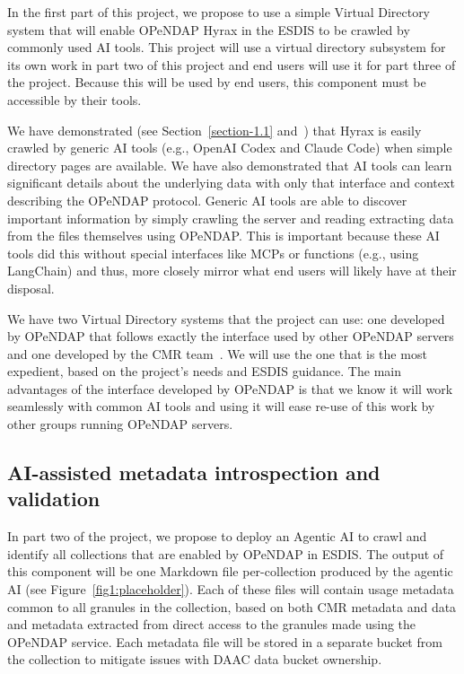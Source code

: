 \documentclass[11pt]{article}
\begin{document}
In the first part of this project, we propose to use a simple Virtual Directory system that will enable \ac{OPeNDAP} Hyrax in the \ac{ESDIS} to be crawled by commonly used \ac{AI} tools. This project will use a virtual directory subsystem for its own work in part two of this project and end users will use it for part three of the project. Because this will be used by end users, this component must be accessible by their tools. 

We have demonstrated (see Section~\ref{section-1.1} and~\cite{grepdap}) that Hyrax is easily crawled by generic \ac{AI} tools (e.g., OpenAI Codex and Claude Code) when simple directory pages are available. We have also demonstrated that \ac{AI} tools can learn significant details about the underlying data with only that interface and context describing the \ac{OPeNDAP} protocol. Generic \ac{AI} tools are able to discover important information by simply crawling the server and reading extracting data from the files themselves using \ac{OPeNDAP}. This is important because these \ac{AI} tools did this without special interfaces like \acp{MCP} or functions (e.g., using LangChain) and thus, more closely mirror what end users will likely have at their disposal.

We have two Virtual Directory systems that the project can use: one developed by \ac{OPeNDAP} that follows exactly the interface used by other \ac{OPeNDAP} servers and one developed by the \ac{CMR} team~\cite{cmrvdi}. We will use the one that is the most expedient, based on the project's needs and \ac{ESDIS} guidance. The main advantages of the interface developed by \ac{OPeNDAP} is that we know it will work seamlessly with common \ac{AI} tools and using it will ease re-use of this work by other groups running \ac{OPeNDAP} servers.


\subsection{AI-assisted metadata introspection and validation}
\label{section-2.2}
In part two of the project, we propose to deploy an Agentic \ac{AI} to crawl and identify all collections that are enabled by \ac{OPeNDAP} in \ac{ESDIS}. The output of this component will be one Markdown file per-collection produced by the agentic \ac{AI} (see Figure~\ref{fig1:placeholder}). Each of these files will contain usage metadata common to all granules in the collection, based on both \ac{CMR} metadata and data and metadata extracted from direct access to the granules made using the \ac{OPeNDAP} service. Each metadata file will be stored in a separate bucket from the collection to mitigate issues with \ac{DAAC} data bucket ownership.
\end{document}
